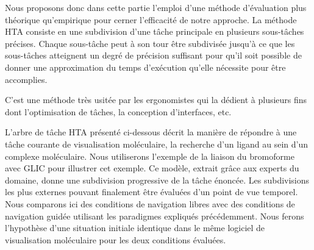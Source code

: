 Nous proposons donc dans cette partie l'emploi d'une méthode d'évaluation plus théorique qu'empirique pour cerner l'efficacité de notre approche. La méthode HTA consiste en une subdivision d'une tâche principale en plusieurs sous-tâches précises. Chaque sous-tâche peut à son tour être subdivisée jusqu'à ce que les sous-tâches atteignent un degré de précision suffisant pour qu'il soit possible de donner une approximation du temps d'exécution qu'elle nécessite pour être accomplies.

C'est une méthode très usitée par les ergonomistes qui la dédient à plusieurs fins dont l'optimisation de tâches, la conception d'interfaces, etc.


L'arbre de tâche HTA présenté ci-dessous décrit la manière de répondre à une tâche courante de visualisation moléculaire, la recherche d'un ligand au sein d'un complexe moléculaire. Nous utiliserons l'exemple de la liaison du bromoforme avec GLIC pour illustrer cet exemple. Ce modèle, extrait grâce aux experts du domaine, donne une subdivision progressive de la tâche énoncée. Les subdivisions les plus externes pouvant finalement être évaluées d'un point de vue temporel. Nous comparons ici des conditions de navigation libres avec des conditions de navigation guidée utilisant les paradigmes expliqués précédemment. Nous ferons l'hypothèse d'une situation initiale identique dans le même logiciel de visualisation moléculaire pour les deux conditions évaluées.
\\
\\
\\
\\
